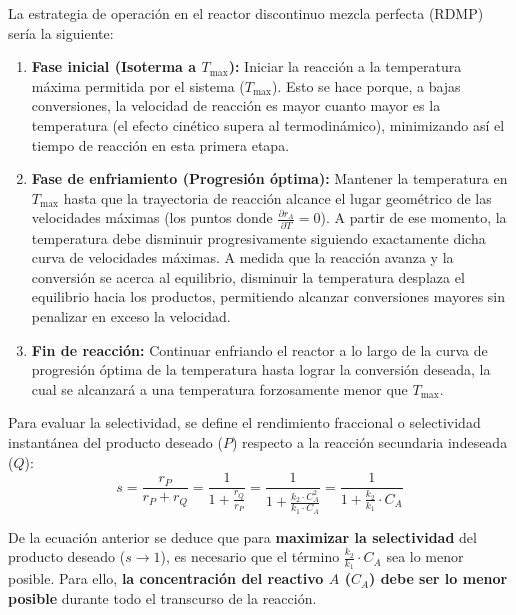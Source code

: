 La estrategia de operación en el reactor discontinuo mezcla perfecta (RDMP) sería la siguiente:
\begin{enumerate}
	\item \textbf{Fase inicial (Isoterma a $T_{\text{max}}$):} Iniciar la reacción a la temperatura máxima permitida por el sistema ($T_{\text{max}}$). Esto se hace porque, a bajas conversiones, la velocidad de reacción es mayor cuanto mayor es la temperatura (el efecto cinético supera al termodinámico), minimizando así el tiempo de reacción en esta primera etapa.
	\item \textbf{Fase de enfriamiento (Progresión óptima):} Mantener la temperatura en $T_{\text{max}}$ hasta que la trayectoria de reacción alcance el lugar geométrico de las velocidades máximas (los puntos donde $\frac{\partial r_A}{\partial T} = 0$). A partir de ese momento, la temperatura debe disminuir progresivamente siguiendo exactamente dicha curva de velocidades máximas. A medida que la reacción avanza y la conversión se acerca al equilibrio, disminuir la temperatura desplaza el equilibrio hacia los productos, permitiendo alcanzar conversiones mayores sin penalizar en exceso la velocidad.
	\item \textbf{Fin de reacción:} Continuar enfriando el reactor a lo largo de la curva de progresión óptima de la temperatura hasta lograr la conversión deseada, la cual se alcanzará a una temperatura forzosamente menor que $T_{\text{max}}$.
\end{enumerate}

\solve{}
Para evaluar la selectividad, se define el rendimiento fraccional o selectividad instantánea del producto deseado ($P$) respecto a la reacción secundaria indeseada ($Q$):
\begin{equation*}
	s = \frac{r_P}{r_P + r_Q} = \frac{1}{1 + \frac{r_Q}{r_P}} = \frac{1}{1 + \frac{k_2 \cdot C_A^2}{k_1 \cdot C_A}} = \frac{1}{1 + \frac{k_2}{k_1} \cdot C_A}
\end{equation*}

De la ecuación anterior se deduce que para \textbf{maximizar la selectividad} del producto deseado ($s \rightarrow 1$), es necesario que el término $\frac{k_2}{k_1} \cdot C_A$ sea lo menor posible. Para ello, \textbf{la concentración del reactivo $A$ ($C_A$) debe ser lo menor posible} durante todo el transcurso de la reacción.

